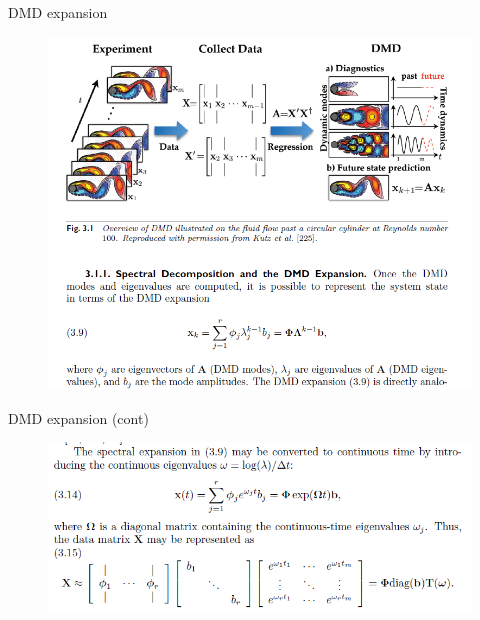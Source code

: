 \documentclass{beamer}
\begin{document}
	\begin{frame}{DMD expansion}
		\begin{figure}[h]
			\centering
				\includegraphics[scale=0.5]{../Figures/fig_dmd_fig3.png}
		\end{figure}	
	\end{frame}
	
	\begin{frame}{DMD expansion (cont)}
		\begin{figure}[h]
			\centering
				\includegraphics[scale=0.5]{../Figures/fig_dmd_fig4.png}
		\end{figure}	
	\end{frame}
	
	
	
\end{document}
